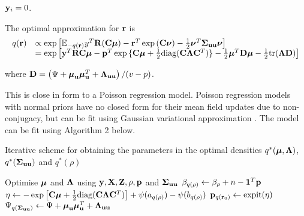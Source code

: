 \documentclass{article}[12pt]
\begin{document}
\noindent {} ${\bf y}_i = 0$.



\noindent The optimal approximation for ${\bf r}$ is
$$
\begin{array}{rl}
q({\bf r}) &\propto \exp \left [ {\mathbb E}_{-q({\bf r})}y^T{\bf R}({\bf C}{\boldsymbol \mu}) - {\bf r}^T\exp{({\bf C}{\boldsymbol\nu})}-{\frac{1}{2}} {\boldsymbol \nu}^T {\boldsymbol \Sigma}_{{\bf u} {\bf u}} {\boldsymbol \nu} \right ] \\
&= \exp{\left [{\bf y}^T{\bf R}{\bf C}{\boldsymbol\mu}- {\bf p}^T \exp{\{{\bf C}{\boldsymbol\mu}+ {\frac{1}{2}}\text{diag}({\bf C}{\boldsymbol\Lambda}{\bf C}^T)\}} - {\frac{1}{2}}{\boldsymbol\mu}^T {\bf D}{\boldsymbol\mu}- {\frac{1}{2}}\text{tr}({\boldsymbol\Lambda}{\bf D}) \right ]}
\end{array}
$$

\noindent where ${\bf D} = \left( \Psi + {\boldsymbol \mu}_{\bf u} {\boldsymbol \mu}_{\bf u}^T + {\boldsymbol \Lambda}_{{\bf u} {\bf u}} \right)/(v - p)$. 

\noindent This is close in form to a Poisson regression model. Poisson regression models
with normal priors have no closed form for their mean field updates due to
non-conjugacy, but can be fit using Gaussian variational approximation
\citep{ormerod09}. The model can be fit using Algorithm 2 below.

\begin{algorithm}\label{alg:algorithm_two}
\label{algorithm2}
\caption[Algorithm 2]{Iterative scheme for obtaining the parameters in the
optimal densities $q^*({\boldsymbol \mu}, {\boldsymbol \Lambda})$, $q^*({\boldsymbol \Sigma}_{{\bf u} {\bf u}})$ and $q^*(\rho)$}
\begin{algorithmic}
\STATE Optimise ${\boldsymbol \mu}$ and ${\boldsymbol \Lambda}$ using ${\bf y}, {\bf X}, {\bf Z}, \rho, {\bf p}$ and
${\boldsymbol \Sigma}_{{\bf u} {\bf u}}$
\STATE $\beta_{q(\rho)} \leftarrow \beta_\rho + n - {\bf 1}^T{\bf p}$
\STATE $\eta \leftarrow -\exp \left [ {\bf C} {\boldsymbol \mu} + {\frac{1}{2}} \text{diag}{({\bf C}{\boldsymbol\Lambda}{\bf C}^T)} \right ] + \psi{(a_{q{(\rho)}})} - \psi{(b_{q{(\rho)}})}$
\STATE ${\bf p}_{q({\bf r}_0)} \leftarrow \text{expit} (\eta)$
\STATE $\Psi_{q({\boldsymbol \Sigma}_{{\bf u} {\bf u}})} \leftarrow \Psi + {\boldsymbol \mu}_{\bf u} {\boldsymbol \mu}_{\bf u}^T + {\boldsymbol \Lambda}_{{\bf u} {\bf u}}$
\ENDWHILE
\end{algorithmic}
\end{algorithm}
\end{document}
